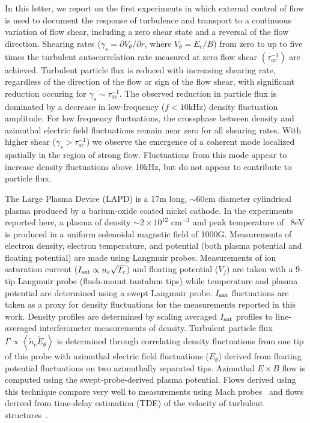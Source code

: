 \documentclass[aip,pop,amsmath,amssymb,reprint,superscriptaddress]{revtex4-1} %
\begin{document}
In this letter, we report on the first experiments in which external control of flow is used to document the response of turbulence and transport to a continuous variation of flow shear, including a zero shear state and a reversal of the flow direction. Shearing rates ($\gamma_{s}= \partial V_{\theta}/\partial r$, where $V_{\theta} = E_r/B$) from zero to up to five times the turbulent autocorrelation rate measured at zero flow shear $(\tau_{ac}^{-1})$ are achieved. Turbulent particle flux is reduced with increasing shearing rate, regardless of the direction of the flow or sign of the flow shear, with significant reduction occuring for $\gamma_{s} \sim \tau_{ac}^{-1}$.  The observed reduction in particle flux is dominated by a decrease in low-frequency ($f < 10$kHz) density fluctuation amplitude. For low frequency fluctuations, the crossphase between density and azimuthal electric field fluctuations remain near zero for all shearing rates.  With higher shear ($\gamma_{s} > \tau_{ac}^{-1}$) we observe the emergence of a coherent mode localized spatially in the region of strong flow. Fluctuations from this mode appear to increase density fluctuations above 10kHz, but do not appear to contribute to particle flux.   

The Large Plasma Device \cite{gek91} (LAPD) is a 17m long, $\sim$60cm diameter cylindrical plasma produced by a barium-oxide coated nickel
cathode. In the experiments reported here, a plasma of density $\sim$$2 \times 10^{12}$ cm$^{-3}$ and peak temperature of ~8eV is
produced in a uniform solenoidal magnetic field of 1000G.  Measurements of electron density, electron temperature, and potential (both plasma
potential and floating potential) are made using Langmuir probes.  
Measurements of ion saturation current ($I_{\rm sat} \propto n_e \sqrt{T_e}$) and floating
potential ($V_f$) are taken with a 9-tip Langmuir probe (flush-mount
tantalum tips) while temperature and plasma potential are
determined using a swept Langmuir probe. $I_{\rm sat}$ fluctuations are taken as a proxy for density fluctuations for the measurements reported in this work. Density profiles are determined by scaling averaged $I_{\rm sat}$ profiles to line-averaged interferometer measurements of density.  Turbulent particle flux
$\Gamma \propto \left<\tilde{n}_e \tilde{E}_\theta\right>$ is
determined through correlating density fluctuations from one tip
of this probe with
azimuthal electric field fluctuations ($E_\theta$) derived from
floating potential fluctuations on two azimuthally separated tips.
Azimuthal $E\times B$ flow is computed
using the swept-probe-derived plasma potential.  Flows derived using
this technique compare very well to measurements using
Mach probes~\cite{maggs07} and flows derived from time-delay
estimation (TDE) of the velocity of turbulent structures~\cite{holland04}.
  
\end{document}
